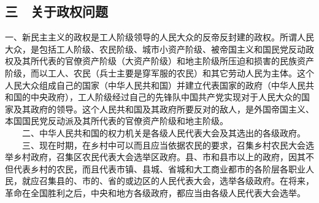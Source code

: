 \documentclass[cn,11pt,chinese]{elegantbook}
\def\myformat#1{\hfil\hfil #1}
\begin{document}
\subsection*{\myformat{三　关于政权问题}}
一、新民主主义的政权是工人阶级领导的人民大众的反帝反封建的政权。所谓人民大众，是包括工人阶级、农民阶级、城市小资产阶级、被帝国主义和国民党反动政权及其所代表的官僚资产阶级（大资产阶级）和地主阶级所压迫和损害的民族资产阶级，而以工人、农民（兵士主要是穿军服的农民）和其它劳动人民为主体。这个人民大众组成自己的国家（中华人民共和国）并建立代表国家的政府（中华人民共和国的中央政府），工人阶级经过自己的先锋队中国共产党实现对于人民大众的国家及其政府的领导。这个人民共和国及其政府所要反对的敌人，是外国帝国主义、本国国民党反动派及其所代表的官僚资产阶级和地主阶级。\\
　　二、中华人民共和国的权力机关是各级人民代表大会及其选出的各级政府。\\
　　三、现在时期，在乡村中可以而且应当依据农民的要求，召集乡村农民大会选举乡村政府，召集区农民代表大会选举区政府。县、市和县市以上的政府，因其不但代表乡村的农民，而且代表市镇、县城、省城和大工商业都市的各阶层各职业人民，就应召集县的、市的、省的或边区的人民代表大会，选举各级政府。在将来，革命在全国胜利之后，中央和地方各级政府，都应当由各级人民代表大会选举。\\
\end{document}
